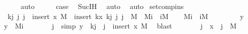 \begin{isabellebody}
\ \ \ \ \isamarkupfalse%
\ auto\isanewline
\ \ \isamarkupfalse%
\ \isamarkupfalse%
\ {\isacharquery}{\kern0pt}case\ \isamarkupfalse%
\ Suc{\isachardot}{\kern0pt}IH\ \isamarkupfalse%
\ auto\ \isanewline
{}\isamarkupfalse%
\ auto%
\endisatagproof
{\isafoldproof}%
%
\isadelimproof
\isanewline
%
\endisadelimproof
\isanewline
{}\isamarkupfalse%
\ set{\isacharunderscore}{\kern0pt}comp{\isacharunderscore}{\kern0pt}ins{\isacharcolon}{\kern0pt}\ \isanewline
\ \ {\isachardoublequoteopen}{\isacharbraceleft}{\kern0pt}{\isacharparenleft}{\kern0pt}k{\isacharcomma}{\kern0pt}j{\isacharparenright}{\kern0pt}\ {\isacharbar}{\kern0pt}j{\isachardot}{\kern0pt}\ j\ {\isasymin}\ insert\ x\ M{\isacharbraceright}{\kern0pt}\ {\isacharequal}{\kern0pt}\ insert\ {\isacharparenleft}{\kern0pt}k{\isacharcomma}{\kern0pt}x{\isacharparenright}{\kern0pt}\ {\isacharbraceleft}{\kern0pt}{\isacharparenleft}{\kern0pt}k{\isacharcomma}{\kern0pt}j{\isacharparenright}{\kern0pt}\ {\isacharbar}{\kern0pt}j{\isachardot}{\kern0pt}\ j\ {\isasymin}\ M{\isacharbraceright}{\kern0pt}{\isachardoublequoteclose}\ {\isacharparenleft}{\kern0pt}\ {\isachardoublequoteopen}{\isacharquery}{\kern0pt}Mi\ {\isacharequal}{\kern0pt}\ {\isacharquery}{\kern0pt}iM{\isachardoublequoteclose}{\isacharparenright}{\kern0pt}\isanewline
%
\isadelimproof
%
\endisadelimproof
%
\isatagproof
{}\isamarkupfalse%
\isanewline
\ \ \isamarkupfalse%
\ {\isachardoublequoteopen}{\isacharquery}{\kern0pt}Mi\ {\isasymsubseteq}\ {\isacharquery}{\kern0pt}iM{\isachardoublequoteclose}\isanewline
\ \ \isamarkupfalse%
\isanewline
\ \ \ \ \isamarkupfalse%
\ y\ \isamarkupfalse%
\ {\isachardoublequoteopen}y\ {\isasymin}\ {\isacharquery}{\kern0pt}Mi{\isachardoublequoteclose}\isanewline
\ \ \ \ \isamarkupfalse%
\ \isamarkupfalse%
\ j\ \ {\isacharbrackleft}{\kern0pt}simp{\isacharbrackright}{\kern0pt}{\isacharcolon}{\kern0pt}\ {\isachardoublequoteopen}y\ {\isacharequal}{\kern0pt}\ {\isacharparenleft}{\kern0pt}k{\isacharcomma}{\kern0pt}j{\isacharparenright}{\kern0pt}{\isachardoublequoteclose}\ \ {\isachardoublequoteopen}j\ {\isasymin}\ insert\ x\ M{\isachardoublequoteclose}\ \isamarkupfalse%
\ blast\isanewline
\ \ \ \ \isamarkupfalse%
\ \isamarkupfalse%
\ {\isachardoublequoteopen}j\ {\isacharequal}{\kern0pt}\ x\ {\isasymor}\ j\ {\isasymin}\ M{\isachardoublequoteclose}\ \isamarkupfalse%

\end{isabellebody}
